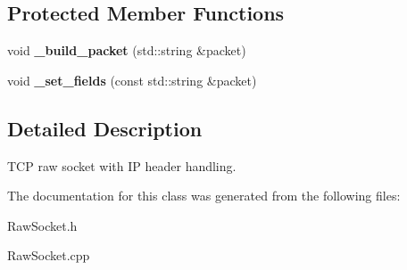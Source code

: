 \subsection*{Protected Member Functions}
\begin{CompactItemize}
\item 
\hypertarget{classsocketpp_1_1TCP__IP__RawSocket_281508237add8a3c530bb0be0b6a1e7b}{
void \textbf{\_\-build\_\-packet} (std::string \&packet)}
\label{classsocketpp_1_1TCP__IP__RawSocket_281508237add8a3c530bb0be0b6a1e7b}

\item 
\hypertarget{classsocketpp_1_1TCP__IP__RawSocket_f8f606ce33835813cc5c3a530e181432}{
void \textbf{\_\-set\_\-fields} (const std::string \&packet)}
\label{classsocketpp_1_1TCP__IP__RawSocket_f8f606ce33835813cc5c3a530e181432}

\end{CompactItemize}


\subsection{Detailed Description}
TCP raw socket with IP header handling. 

The documentation for this class was generated from the following files:\begin{CompactItemize}
\item 
RawSocket.h\item 
RawSocket.cpp\end{CompactItemize}
